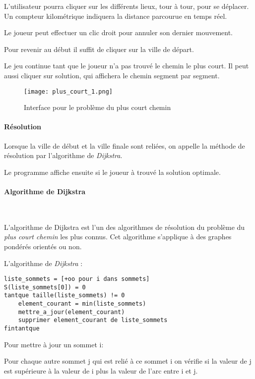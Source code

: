         L'utilisateur pourra cliquer sur les différents lieux, tour à tour,
        pour se déplacer. Un compteur kilométrique indiquera la
        distance parcourue en temps réel.

        Le joueur peut effectuer un clic droit pour annuler son dernier
        mouvement.

        Pour revenir au début il suffit de cliquer sur la ville de départ.

        Le jeu continue tant que le joueur n'a pas trouvé le chemin
        le plus court. Il peut aussi cliquer sur \og solution\fg, qui
        affichera le chemin segment par segment.

\begin{figure}[h]
\begin{center}
    \texttt{[image: plus\_court\_1.png]} 
    \caption{Interface pour le problème du plus court chemin}
\end{center}
\end{figure}

        \paragraph{Résolution}
            Lorsque la ville de début et la ville finale sont reliées,
            on appelle la méthode de résolution par l'algorithme de \emph{Dijkstra}.

            Le programme affiche ensuite si le joueur à trouvé la solution optimale.

		\paragraph{Algorithme de Dijkstra} ~\cite{ref.dijkstra}

			L'algorithme de Dijkstra est l'un des algorithmes de résolution du problème du
			\emph{plus court chemin} les plus connus. Cet algorithme s'applique à des graphes pondérés orientés ou non.

			L'algorithme de \emph{Dijkstra} :
			\begin{lstlisting}
liste_sommets = [+oo pour i dans sommets]
S(liste_sommets[0]) = 0
tantque taille(liste_sommets) != 0
    element_courant = min(liste_sommets)
    mettre_a_jour(element_courant)
    supprimer element_courant de liste_sommets
fintantque
			\end{lstlisting}
			Pour mettre à jour un sommet i:

				Pour chaque autre sommet j qui est relié à ce sommet i on vérifie si
				la valeur de j est supérieure à la valeur de i plus la valeur de l'arc entre i et j.


